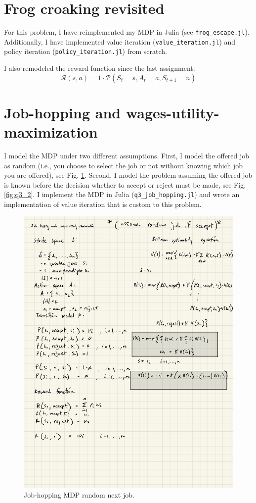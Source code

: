 \documentclass[12pt]{article}
\begin{document}
\clearpage
\section{Frog croaking revisited}
For this problem, I have reimplemented my MDP in Julia (see \texttt{frog\_escape.jl}). Additionally, I have implemented value iteration (\texttt{value\_iteration.jl}) and policy iteration (\texttt{policy\_iteration.jl}) from scratch.

I also remodeled the reward function since the last assignment:
$$\mathcal{R}(s, a) = 1 \cdot \mathcal{P}(S_t = s, A_t = a, S_{t+1} = n)$$


\section{Job-hopping and wages-utility-maximization}
I model the MDP under two different assumptions. First, I model the offered job as random (i.e., you choose to select the job or not without knowing which job you are offered), see Fig. \ref{fig:q3_1}. Second, I model the problem assuming the offered job is known before the decision whether to accept or reject must be made, see Fig. \ref{fig:q3_2}. I implement the MDP in Julia (\texttt{q3\_job\_hopping.jl}) and wrote an implementation of value iteration that is custom to this problem.

\begin{figure}[h]
	\centering
	\includegraphics[width=.75\textwidth]{ipad/q3_1.jpg}
	\caption{Job-hopping MDP random next job.}
	\label{fig:q3_1}
\end{figure}
\end{document}
